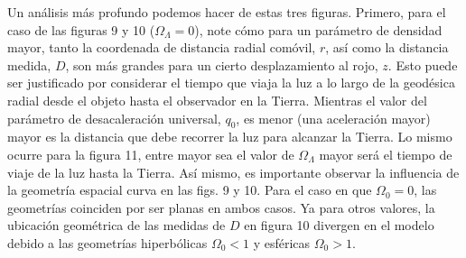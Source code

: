 \documentclass[11pt]{article}
\begin{document}
{    
    Un análisis más profundo podemos hacer de estas tres figuras. Primero, para el caso de las figuras 9 y 10 ($\Omega_{\Lambda} =0$), note cómo para un parámetro de densidad mayor, tanto la coordenada de distancia radial comóvil, $r$, así como la distancia medida, $D$, son más grandes para un cierto desplazamiento al rojo, $z$. Esto puede ser justificado por considerar el tiempo que viaja la luz a lo largo de la geodésica radial desde el objeto hasta el observador en la Tierra. Mientras el valor del parámetro de desacaleración universal, $q_0$, es menor (una aceleración mayor) mayor es la distancia que debe recorrer la luz para alcanzar la Tierra. Lo mismo ocurre para la figura 11, entre mayor sea el valor de $\Omega_{\Lambda}$ mayor será el tiempo de viaje de la luz hasta la Tierra. Así mismo, es importante observar la influencia de la geometría espacial curva en las figs. 9 y 10. Para el caso en que $\Omega_0 = 0$, las geometrías coinciden por ser planas en ambos casos. Ya para otros valores, la ubicación geométrica de las medidas de $D$ en figura 10 divergen en el modelo debido a las geometrías hiperbólicas $\Omega_0 <1$ y esféricas $\Omega_0 >1$. 
    
}
\end{document}
